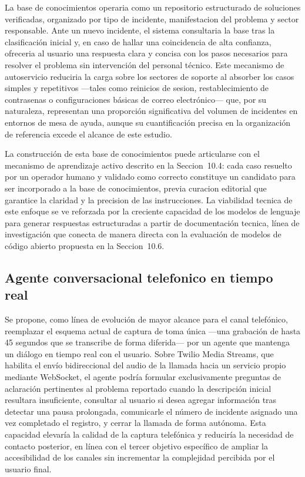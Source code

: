 La base de conocimientos operaria como un repositorio estructurado de soluciones verificadas, organizado por tipo de incidente, manifestacion del problema y sector responsable. Ante un nuevo incidente, el sistema consultaria la base tras la clasificación inicial y, en caso de hallar una coincidencia de alta confianza, ofreceria al usuario una respuesta clara y concisa con los pasos necesarios para resolver el problema sin intervención del personal técnico. Este mecanismo de autoservicio reduciria la carga sobre los sectores de soporte al absorber los casos simples y repetitivos ---tales como reinicios de sesion, restablecimiento de contrasenas o configuraciones básicas de correo electrónico--- que, por su naturaleza, representan una proporción significativa del volumen de incidentes en entornos de mesa de ayuda, aunque su cuantificación precisa en la organización de referencia excede el alcance de este estudio.

La construcción de esta base de conocimientos puede articularse con el mecanismo de aprendizaje activo descrito en la Seccion~10.4: cada caso resuelto por un operador humano y validado como correcto constituye un candidato para ser incorporado a la base de conocimientos, previa curacion editorial que garantice la claridad y la precision de las instrucciones. La viabilidad tecnica de este enfoque se ve reforzada por la creciente capacidad de los modelos de lenguaje para generar respuestas estructuradas a partir de documentación tecnica, línea de investigación que conecta de manera directa con la evaluación de modelos de código abierto propuesta en la Seccion~10.6.

\subsection{Agente conversacional telefonico en tiempo real}

Se propone, como línea de evolución de mayor alcance para el canal telefónico, reemplazar el esquema actual de captura de toma única ---una grabación de hasta 45 segundos que se transcribe de forma diferida--- por un agente que mantenga un diálogo en tiempo real con el usuario. Sobre Twilio Media Streams, que habilita el envío bidireccional del audio de la llamada hacia un servicio propio mediante WebSocket, el agente podría formular exclusivamente preguntas de aclaración pertinentes al problema reportado cuando la descripción inicial resultara insuficiente, consultar al usuario si desea agregar información tras detectar una pausa prolongada, comunicarle el número de incidente asignado una vez completado el registro, y cerrar la llamada de forma autónoma. Esta capacidad elevaría la calidad de la captura telefónica y reduciría la necesidad de contacto posterior, en línea con el tercer objetivo específico de ampliar la accesibilidad de los canales sin incrementar la complejidad percibida por el usuario final.

